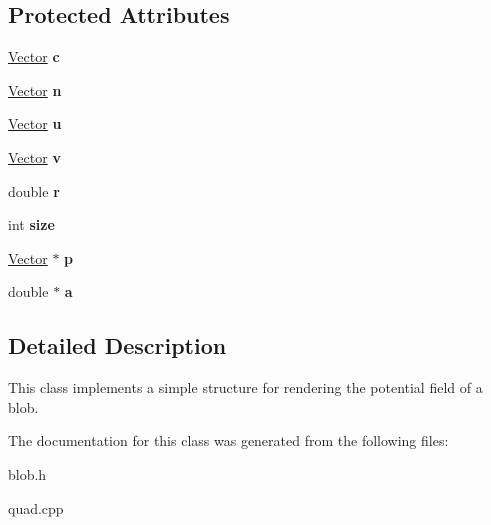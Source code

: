 \subsection*{Protected Attributes}
\begin{DoxyCompactItemize}
\item 
\hypertarget{class_quad_adbf69daa166febce45b415fdfbfa100f}{
\hyperlink{class_vector}{Vector} {\bfseries c}}
\label{class_quad_adbf69daa166febce45b415fdfbfa100f}

\item 
\hypertarget{class_quad_aae3b38345fcab4c6e79fe5a33fa79b37}{
\hyperlink{class_vector}{Vector} {\bfseries n}}
\label{class_quad_aae3b38345fcab4c6e79fe5a33fa79b37}

\item 
\hypertarget{class_quad_a7fdd3b504977b115cceabbfa486b3a38}{
\hyperlink{class_vector}{Vector} {\bfseries u}}
\label{class_quad_a7fdd3b504977b115cceabbfa486b3a38}

\item 
\hypertarget{class_quad_a0f9754866ac23167f46eeb8348ef8a33}{
\hyperlink{class_vector}{Vector} {\bfseries v}}
\label{class_quad_a0f9754866ac23167f46eeb8348ef8a33}

\item 
\hypertarget{class_quad_a71c618726dba26b2c48b541594f92b17}{
double {\bfseries r}}
\label{class_quad_a71c618726dba26b2c48b541594f92b17}

\item 
\hypertarget{class_quad_a88599ce4c74de2c4560a782313ce3621}{
int {\bfseries size}}
\label{class_quad_a88599ce4c74de2c4560a782313ce3621}

\item 
\hypertarget{class_quad_a6038241c94967ca3974721ad26d1f4f6}{
\hyperlink{class_vector}{Vector} $\ast$ {\bfseries p}}
\label{class_quad_a6038241c94967ca3974721ad26d1f4f6}

\item 
\hypertarget{class_quad_a990cde4891ef0fda732b32d9e6144734}{
double $\ast$ {\bfseries a}}
\label{class_quad_a990cde4891ef0fda732b32d9e6144734}

\end{DoxyCompactItemize}


\subsection{Detailed Description}
This class implements a simple structure for rendering the potential field of a blob. 

The documentation for this class was generated from the following files:\begin{DoxyCompactItemize}
\item 
blob.h\item 
quad.cpp\end{DoxyCompactItemize}
